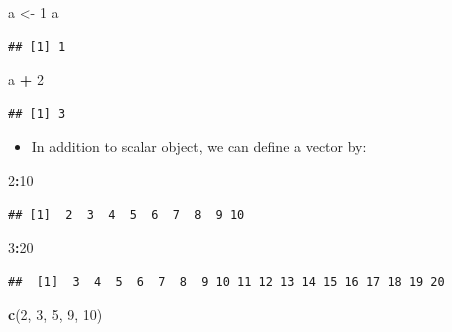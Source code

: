 \documentclass[]{book}
\newenvironment{Shaded}{\begin{snugshade}}{\end{snugshade}}
\newcommand{\KeywordTok}[1]{\textcolor[rgb]{0.13,0.29,0.53}{\textbf{#1}}}
\newcommand{\DecValTok}[1]{\textcolor[rgb]{0.00,0.00,0.81}{#1}}
\newcommand{\StringTok}[1]{\textcolor[rgb]{0.31,0.60,0.02}{#1}}
\newcommand{\OperatorTok}[1]{\textcolor[rgb]{0.81,0.36,0.00}{\textbf{#1}}}
\newcommand{\NormalTok}[1]{#1}
\providecommand{\tightlist}{%
  \setlength{\itemsep}{0pt}\setlength{\parskip}{0pt}}
\begin{document}
\begin{Shaded}
\begin{Highlighting}[]
\NormalTok{a <-}\StringTok{ }\DecValTok{1}
\NormalTok{a}
\end{Highlighting}
\end{Shaded}

\begin{verbatim}
## [1] 1
\end{verbatim}

\begin{Shaded}
\begin{Highlighting}[]
\NormalTok{a }\OperatorTok{+}\StringTok{ }\DecValTok{2}
\end{Highlighting}
\end{Shaded}

\begin{verbatim}
## [1] 3
\end{verbatim}

\begin{itemize}
\tightlist
\item
  In addition to scalar object, we can define a vector by:
\end{itemize}

\begin{Shaded}
\begin{Highlighting}[]
\DecValTok{2}\OperatorTok{:}\DecValTok{10}
\end{Highlighting}
\end{Shaded}

\begin{verbatim}
## [1]  2  3  4  5  6  7  8  9 10
\end{verbatim}

\begin{Shaded}
\begin{Highlighting}[]
\DecValTok{3}\OperatorTok{:}\DecValTok{20}
\end{Highlighting}
\end{Shaded}

\begin{verbatim}
##  [1]  3  4  5  6  7  8  9 10 11 12 13 14 15 16 17 18 19 20
\end{verbatim}

\begin{Shaded}
\begin{Highlighting}[]
\KeywordTok{c}\NormalTok{(}\DecValTok{2}\NormalTok{, }\DecValTok{3}\NormalTok{, }\DecValTok{5}\NormalTok{, }\DecValTok{9}\NormalTok{, }\DecValTok{10}\NormalTok{)}
\end{Highlighting}
\end{Shaded}
\end{document}
